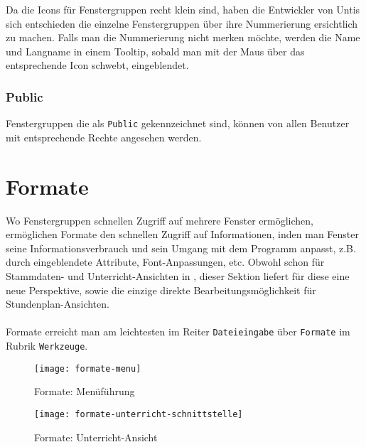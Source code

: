 Da die Icons für Fenstergruppen recht klein sind, haben die Entwickler von Untis sich entschieden die einzelne Fenstergruppen über ihre Nummerierung ersichtlich zu machen. Falls man die Nummerierung nicht merken möchte, werden die Name und Langname in einem Tooltip, sobald man mit der Maus über das entsprechende Icon schwebt, eingeblendet.

\subsubsection{Public}

Fenstergruppen die als \texttt{Public} gekennzeichnet sind, können von allen Benutzer mit entsprechende Rechte angesehen werden.

\section{Formate}
\label{sec:formate}

Wo Fenstergruppen schnellen Zugriff auf mehrere Fenster ermöglichen, ermöglichen Formate den schnellen Zugriff auf Informationen, inden man Fenster seine Informationsverbrauch und sein Umgang mit dem Programm anpasst, z.B. durch eingeblendete Attribute, Font-Anpassungen, etc. Obwohl schon für Stammdaten- und Unterricht-Ansichten in 
, dieser Sektion liefert für diese eine neue Perspektive, sowie die einzige direkte Bearbeitungsmöglichkeit für Stundenplan-Ansichten.\\
\\
Formate erreicht man am leichtesten im Reiter \texttt{Dateieingabe} über \texttt{Formate} im Rubrik \texttt{Werkzeuge}.\\

\begin{figure}[h]
	\texttt{[image: formate-menu]}
	\vspace{-15pt}
	\caption{Formate: Menüführung}
	\label{fig:formate-menu}
\end{figure}

\vspace{10pt}

\begin{wrapfigure}{r}{0.4\textwidth}
	\centering
	\vspace{-14pt}
	\texttt{[image: formate-unterricht-schnittstelle]}
	\vspace{-5pt}
	\caption{Formate: Unterricht-Ansicht}
	\label{fig:formate-unterricht-schnittstelle}
	\vspace{-15pt}
\end{wrapfigure}

